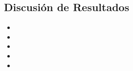 \subsection{Discusión de Resultados}

\begin{itemize}
    \item \lipsum[1]
    \item \lipsum[2]
    \item \lipsum[3]
    \item \lipsum[4]
    \item \lipsum[5]
\end{itemize}